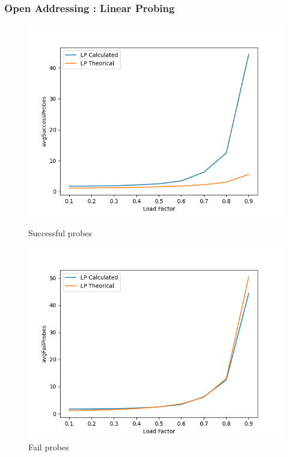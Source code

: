 \documentclass{article}
\begin{document}
    \subsubsection*{Open Addressing : Linear Probing}
    
        \begin{figure}[!h]
              \includegraphics[width=\linewidth]{images/loadFactor_vs_avgSuccessProbes_LP.png}
              \caption{Successful probes}\label{fig:plot4}
            \endminipage\hfill
              \includegraphics[width=\linewidth]{images/loadFactor_vs_avgFailProbes_LP.png}
              \caption{Fail probes}\label{fig:plot5}
            \endminipage
        \end{figure}
        
\end{document}
